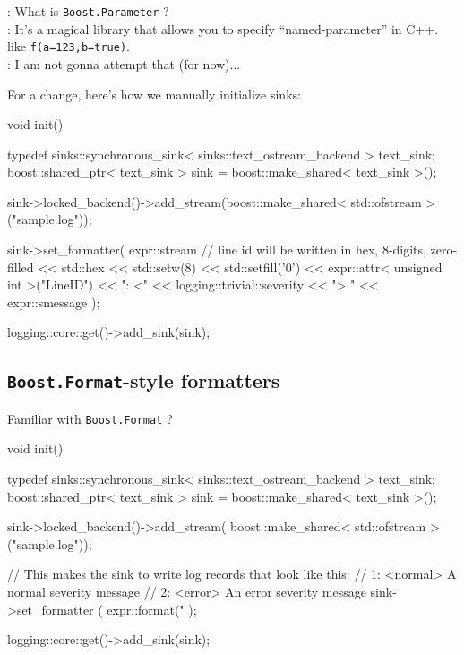 \documentclass[dvipsnames]{article}
\begin{document}
\begin{tcolorbox}
   : What is \texttt{Boost.Parameter} ?\\
   : It's a magical library that allows you to specify
  ``named-parameter'' in C++. like \texttt{f(a=123,b=true)}.\\
   : I am not gonna attempt that (for now)...
\end{tcolorbox}

For a change, here's how we manually initialize sinks:

\begin{simplec}
  void init(){
    typedef sinks::synchronous_sink< sinks::text_ostream_backend > text_sink;
    boost::shared_ptr< text_sink > sink = boost::make_shared< text_sink >();

    sink->locked_backend()->add_stream(boost::make_shared< std::ofstream >("sample.log"));

    sink->set_formatter(
    expr::stream
    // line id will be written in hex, 8-digits, zero-filled
    << std::hex << std::setw(8) << std::setfill('0') << expr::attr< unsigned int >("LineID")
    << ": <" << logging::trivial::severity
    << "> " << expr::smessage
    );

    logging::core::get()->add_sink(sink);
} 
\end{simplec}

\subsection{\texttt{Boost.Format}-style formatters}
Familiar with \texttt{Boost.Format} ?

\begin{simplec}
  void init(){
    typedef sinks::synchronous_sink< sinks::text_ostream_backend > text_sink;
    boost::shared_ptr< text_sink > sink = boost::make_shared< text_sink >();

    sink->locked_backend()->add_stream(
    boost::make_shared< std::ofstream >("sample.log"));

    // This makes the sink to write log records that look like this:
    // 1: <normal> A normal severity message
    // 2: <error> An error severity message
    sink->set_formatter
    (
    expr::format("%
    );

    logging::core::get()->add_sink(sink);
  }
\end{simplec}
\end{document}
